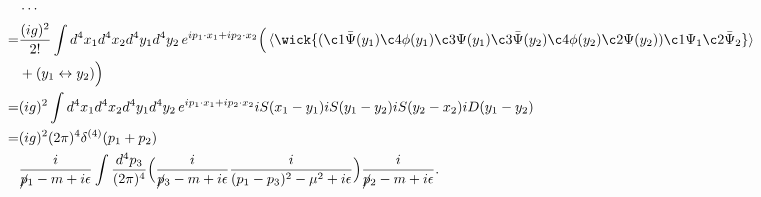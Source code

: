 \begin{itemize}
	\begin{tcolorbox}[title=calculation:]
		\begin{align}
			& \cdots \notag \\
			=& \frac{(i g)^2}{2!} \int d^4 x_1 d^4 x_2 d^4 y_1 d^4 y_2 \, e^{i p_1 \cdot x_1 + i p_2 \cdot x_2} \Big( \braket{\wick{
				(\c1 {\bar{\Psi}}(y_1) \c4 \phi(y_1) \c3 \Psi(y_1) \c3 {\bar{\Psi}}(y_2) \c4 \phi(y_2) \c2 \Psi(y_2)) \c1 \Psi_1 \c2 {\bar{\Psi}}_2
			}} \notag \\
			& + (y_1 \leftrightarrow y_2) \Big) \notag \\
			=& (i g)^2 \int d^4 x_1 d^4 x_2 d^4 y_1 d^4 y_2 \, e^{i p_1 \cdot x_1 + i p_2 \cdot x_2} i S(x_1 - y_1) i S(y_1 - y_2) i S(y_2 - x_2) i D(y_1 - y_2) \notag \\
			=& (i g)^2 (2 \pi)^4 \delta^{(4)}(p_1 + p_2) \notag \\
			& \frac{i}{\cancel{p}_1 - m + i \epsilon} \int \frac{d^4 p_3}{(2 \pi)^4} \Big( \frac{i}{\cancel{p}_3 - m + i \epsilon} \frac{i}{(p_1 - p_3)^2 - \mu^2 + i \epsilon} \Big) \frac{i}{\cancel{p}_2 - m + i \epsilon}.
		\end{align}
	\end{tcolorbox}
\end{itemize}
